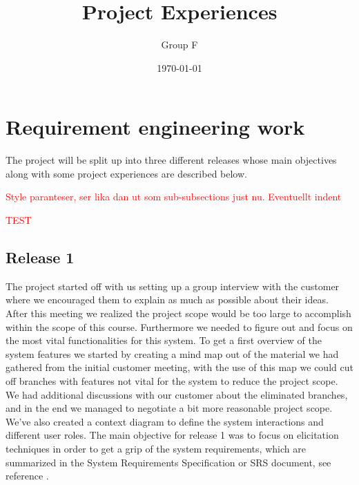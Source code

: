 \documentclass[10pt]{article}
\newcommand\todo[1]{\textcolor{red}{#1}}
\begin{document}
\makeatletter
\renewcommand{\@biblabel}[1]{\quad#1.}
\makeatother


\pagestyle{myheadings}





\begin{titlepage}
\title{Project Experiences}
\author{Group F}
\date{\today}
\maketitle
\thispagestyle{empty}
\end{titlepage}

\tableofcontents
\thispagestyle{empty}
\newpage
{}

\section{Requirement engineering work}
\noindent The project will be split up into three different releases whose main objectives along with some project experiences are described below.

\todo{Style paranteser, ser lika dan ut som sub-subsections just nu. Eventuellt indent}

\todo{TEST}

\subsection{Release 1}
The project started off with us setting up a group interview with the customer where we encouraged them to explain as much as possible about their ideas. After this meeting we realized the project scope would be too large to accomplish within the scope of this course. Furthermore we needed to figure out and focus on the most vital functionalities for this system.
To get a first overview of the system features we started by creating a mind map out of the material we had gathered from the initial customer meeting, with the use of this map we could cut off branches with features not vital for the system to reduce the project scope.
We had additional discussions with our customer about the eliminated branches, and in the end we managed to negotiate a bit more reasonable project scope.
\newline We've also created a context diagram to define the system interactions and different user roles.
The main objective for release 1 was to focus on elicitation techniques in order to get a grip of the system requirements, which are summarized in the System Requirements Specification or SRS document, see reference \cite{srs}.
\end{document}
